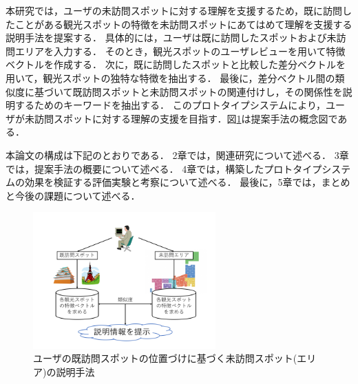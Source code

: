 \documentclass{deimj}
\begin{document}
本研究では，ユーザの未訪問スポットに対する理解を支援するため，既に訪問したことがある観光スポットの特徴を未訪問スポットにあてはめて理解を支援する説明手法を提案する．
具体的には，ユーザは既に訪問したスポットおよび未訪問エリアを入力する．
そのとき，観光スポットのユーザレビューを用いて特徴ベクトルを作成する．
次に，既に訪問したスポットと比較した差分ベクトルを用いて，観光スポットの独特な特徴を抽出する．
最後に，差分ベクトル間の類似度に基づいて既訪問スポットと未訪問スポットの関連付けし，その関係性を説明するためのキーワードを抽出する．
このプロトタイプシステムにより，ユーザが未訪問スポットに対する理解の支援を目指す．図\ref{fig:photo_image}は提案手法の概念図である．

本論文の構成は下記のとおりである．
2章では，関連研究について述べる．
3章では，提案手法の概要について述べる．
4章では，構築したプロトタイプシステムの効果を検証する評価実験と考察について述べる．
最後に，5章では，まとめと今後の課題について述べる．

\begin{figure}[t]
  \begin{center}
    \includegraphics[clip,width=7.0cm]{picture/Photo_Image_jap.png}
    \caption{ユーザの既訪問スポットの位置づけに基づく未訪問スポット(エリア)の説明手法}
    \label{fig:photo_image}
   \end{center}
\end{figure}


\end{document}
